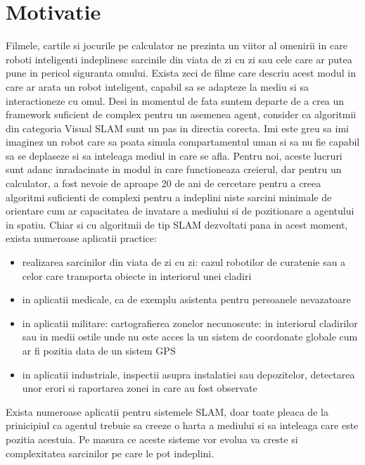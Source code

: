\documentclass[12pt,a4paper]{report}
\begin{document}
\section{Motivatie}
Filmele, cartile si jocurile pe calculator ne prezinta un viitor al omenirii in care
roboti inteligenti indeplinesc sarcinile din viata de zi cu zi sau cele 
care ar putea pune in pericol siguranta omului. Exista zeci de filme care descriu 
acest modul in care ar arata un robot inteligent, capabil sa se adapteze la mediu si sa 
interactioneze cu omul. Desi in momentul de fata suntem departe de a crea un framework 
suficient de complex pentru un asemenea agent, consider ca algoritmii din categoria 
Visual SLAM sunt un pas in directia corecta. Imi este greu sa imi imaginez un robot care
sa poata simula compartamentul uman si sa nu fie capabil sa se deplaseze si sa inteleaga mediul in care se afla. Pentru noi, 
aceste lucruri sunt adanc inradacinate in modul in care functioneaza creierul, dar pentru
un calculator, a fost nevoie de aproape 20 de ani de cercetare pentru a creea algoritmi 
suficienti de complexi pentru a indeplini niste sarcini minimale de orientare cum ar 
capacitatea de invatare a mediului si de pozitionare a agentului in spatiu. Chiar si cu
algoritmii de tip SLAM dezvoltati pana in acest moment, exista numeroase aplicatii 
practice: 
\begin{itemize}
    \item realizarea sarcinilor din viata de zi cu zi: cazul robotilor de curatenie
sau a celor care transporta obiecte in interiorul unei cladiri 
    \item in aplicatii medicale, ca de exemplu asistenta pentru persoanele nevazatoare
    \item in aplicatii militare: cartografierea zonelor necunoscute: in interiorul
cladirilor sau in medii ostile unde nu este acces la un sistem de coordonate globale
cum ar fi pozitia data de un sistem GPS  
    \item in aplicatii industriale, inspectii asupra instalatiei sau depozitelor, 
detectarea unor erori si raportarea zonei in care au fost observate    
\end{itemize}
Exista numeroase aplicatii pentru sistemele SLAM, doar toate pleaca de la prinicipiul 
ca agentul trebuie sa creeze o harta a mediului si sa inteleaga care este pozitia acestuia.
Pe masura ce aceste sisteme vor evolua va creste si complexitatea sarcinilor pe 
care le pot indeplini.   
\end{document}
